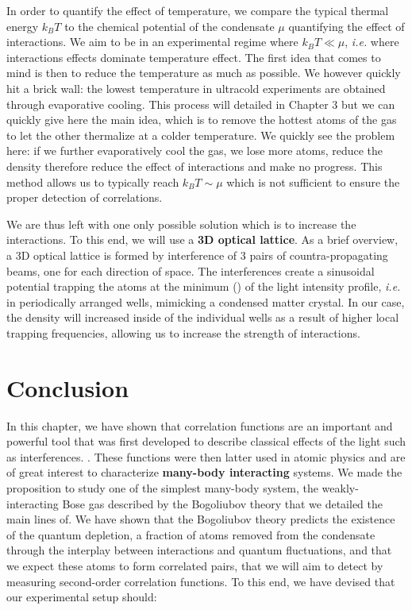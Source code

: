 {In order to quantify the effect of temperature, we compare the typical thermal energy $k_B T$ to the chemical potential of the condensate $\mu$ quantifying the effect of interactions. We aim to be in an experimental regime where $k_B T \ll \mu$, {\it i.e.} where interactions effects dominate temperature effect. The first idea that comes to mind is then to reduce the temperature as much as possible. We however quickly hit a brick wall: the lowest temperature in ultracold experiments are obtained through evaporative cooling. This process will detailed in Chapter 3 but we can quickly give here the main idea, which is to remove the hottest atoms of the gas to let the other thermalize at a colder temperature. We quickly see the problem here: if we further evaporatively cool the gas, we lose more atoms, reduce the density therefore reduce the effect of interactions and make no progress. This method allows us to typically reach $k_B T \sim \mu$ which is not sufficient to ensure the proper detection of \kmk correlations.

We are thus left with one only possible solution which is to increase the interactions. To this end, we will use a \textbf{3D optical lattice}. As a brief overview, a 3D optical lattice is formed by interference of 3 pairs of countra-propagating beams, one for each direction of space. The interferences create a sinusoidal potential trapping the atoms at the minimum () of the light intensity profile, {\it i.e.} in periodically arranged wells, mimicking a condensed matter crystal. In our case, the density will increased inside of the individual wells as a result of higher local trapping frequencies, allowing us to increase the strength of interactions.

\section{Conclusion}

In this chapter, we have shown that correlation functions are an important and powerful tool that was first developed to describe classical effects of the light such as interferences. . These functions were then latter used in atomic physics and are of great interest to characterize \textbf{many-body interacting} systems. We made the proposition to study one of the simplest many-body system, the weakly-interacting Bose gas described by the Bogoliubov theory that we detailed the main lines of. We have shown that the Bogoliubov theory predicts the existence of the quantum depletion, a fraction of atoms removed from the condensate through the interplay between interactions and quantum fluctuations, and that we expect these atoms to form \kmk correlated pairs, that we will aim to detect by measuring second-order correlation functions. To this end, we have devised that our experimental setup should:

}
